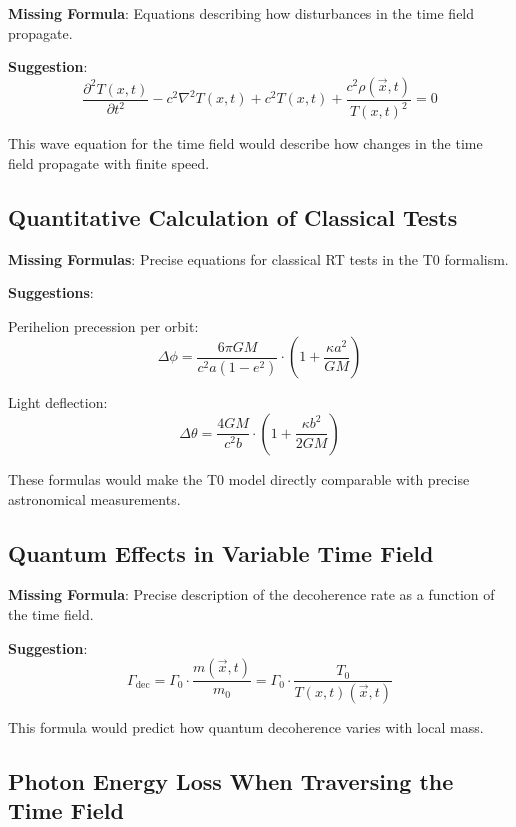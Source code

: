 \documentclass[12pt,a4paper]{article}
\newcommand{\Tfieldt}{T(x,t)}
\newcommand{\vecx}{\vec{x}}
\begin{document}
	\textbf{Missing Formula}: Equations describing how disturbances in the time field propagate.
	
	\textbf{Suggestion}:
	\begin{equation}
		\frac{\partial^2\Tfieldt}{\partial t^2} - c^2\nabla^2\Tfieldt + c^2\Tfieldt + \frac{c^2\rho(\vecx,t)}{\Tfieldt^2} = 0
	\end{equation}
	
	This wave equation for the time field would describe how changes in the time field propagate with finite speed.
	
	\subsection{Quantitative Calculation of Classical Tests}
	\label{subsec:classical_tests}
	
	\textbf{Missing Formulas}: Precise equations for classical RT tests in the T0 formalism.
	
	\textbf{Suggestions}:
	
	Perihelion precession per orbit:
	\begin{equation}
		\Delta\phi = \frac{6\pi GM}{c^2a(1-e^2)} \cdot \left(1 + \frac{\kappa a^2}{GM}\right)
	\end{equation}
	
	Light deflection:
	\begin{equation}
		\Delta\theta = \frac{4GM}{c^2b} \cdot \left(1 + \frac{\kappa b^2}{2GM}\right)
	\end{equation}
	
	These formulas would make the T0 model directly comparable with precise astronomical measurements.
	
	\subsection{Quantum Effects in Variable Time Field}
	\label{subsec:quantum_effects}
	
	\textbf{Missing Formula}: Precise description of the decoherence rate as a function of the time field.
	
	\textbf{Suggestion}:
	\begin{equation}
		\Gamma_{\text{dec}} = \Gamma_0 \cdot \frac{m(\vecx,t)}{m_0} = \Gamma_0 \cdot \frac{T_0}{\Tfieldt(\vecx,t)}
	\end{equation}
	
	This formula would predict how quantum decoherence varies with local mass.
	
	\subsection{Photon Energy Loss When Traversing the Time Field}
	\label{subsec:photon_energy_loss}
	
\end{document}
